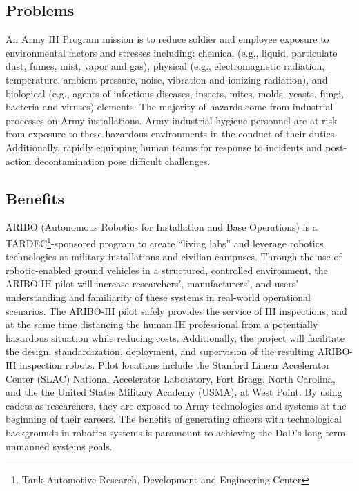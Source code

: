 \subsection{Problems}

An Army IH Program mission is to reduce soldier and employee exposure to environmental factors and stresses including:  chemical (e.g., liquid, particulate dust, fumes, mist, vapor and gas), physical (e.g., electromagnetic radiation, temperature, ambient pressure, noise, vibration and ionizing radiation), and biological (e.g., agents of infectious diseases, insects, mites, molds, yeasts, fungi, bacteria and viruses) elements\cite{ArmymedPAM40503}. The majority of hazards come from industrial processes on Army installations. Army industrial hygiene personnel are at risk from exposure to these hazardous environments in the conduct of their duties. Additionally, rapidly equipping human teams for response to incidents and post-action decontamination pose difficult challenges.  

\subsection{Benefits}

ARIBO (Autonomous Robotics for Installation and Base Operations) is a TARDEC\footnote{Tank Automotive Research, Development and Engineering Center}-sponsored program to create ``living labs'' and leverage robotics technologies at military installations and civilian campuses. Through the use of robotic-enabled ground vehicles in a structured, controlled environment, the ARIBO-IH pilot will increase researchers’, manufacturers’, and users’ understanding and familiarity of these systems in real-world operational scenarios. The ARIBO-IH pilot safely provides the service of IH inspections, and at the same time distancing the human IH professional from a potentially hazardous situation while reducing costs. Additionally, the project will facilitate the design, standardization, deployment, and supervision of the resulting ARIBO-IH inspection robots. Pilot locations include the Stanford Linear Accelerator Center (SLAC) National Accelerator Laboratory, Fort Bragg, North Carolina, and the the United States Military Academy (USMA), at West Point. By using cadets as researchers, they are exposed to Army technologies and systems at the beginning of their careers. The benefits of generating officers with technological backgrounds in robotics systems is paramount to achieving the DoD’s long term unmanned systems goals.

